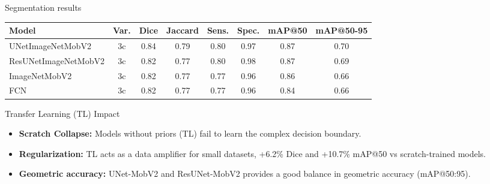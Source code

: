 \documentclass[aspectratio=169]{beamer}
\begin{document}
\begin{frame}{Segmentation results}
        \begin{table}[H]
    \centering
    \label{tab:compare_best}
    \small
    \setlength{\tabcolsep}{4pt}
    \begin{tabular}{l|c|c|c|c|c|c|c}
    \hline
    \textbf{Model} & \textbf{Var.} & \textbf{Dice} & \textbf{Jaccard} & \textbf{Sens.} & \textbf{Spec.} & \textbf{mAP@50} & \textbf{mAP@50-95} \\
    \hline
    UNetImageNetMobV2 & 3c & 0.84 & 0.79 & 0.80 & 0.97 & 0.87 & 0.70 \\
    ResUNetImageNetMobV2 & 3c & 0.82 & 0.77 & 0.80 & 0.98 & 0.87 & 0.69 \\
    ImageNetMobV2 & 3c & 0.82 & 0.77 & 0.77 & 0.96 & 0.86 & 0.66 \\
    FCN & 3c & 0.82 & 0.77 & 0.77 & 0.96 & 0.84 & 0.66 \\
    \hline
    \end{tabular}
    \end{table}


    \begin{exampleblock}{Transfer Learning (TL) Impact}
        \scriptsize
        \begin{itemize}
            \item \textbf{Scratch Collapse:} Models without priors (TL) fail to learn the complex decision boundary.
            \item \textbf{Regularization:} TL acts as a data amplifier for small datasets, +6.2\% Dice and +10.7\% mAP@50 vs scratch-trained models.
            \item \textbf{Geometric accuracy:} UNet-MobV2 and ResUNet-MobV2 provides a good balance in geometric accuracy (mAP@50:95).
        \end{itemize}
    \end{exampleblock}

\end{frame}
\end{document}
